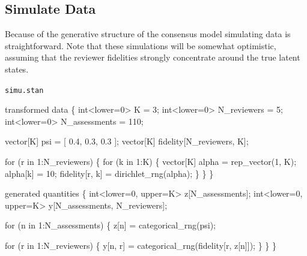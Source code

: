 \documentclass[
  letterpaper,
  DIV=11,
  numbers=noendperiod]{scrartcl}
\newenvironment{Shaded}{\begin{snugshade}}{\end{snugshade}}
\newcommand{\ControlFlowTok}[1]{\textcolor[rgb]{0.00,0.23,0.31}{#1}}
\newcommand{\DataTypeTok}[1]{\textcolor[rgb]{0.68,0.00,0.00}{#1}}
\newcommand{\DecValTok}[1]{\textcolor[rgb]{0.68,0.00,0.00}{#1}}
\newcommand{\FloatTok}[1]{\textcolor[rgb]{0.68,0.00,0.00}{#1}}
\newcommand{\KeywordTok}[1]{\textcolor[rgb]{0.00,0.23,0.31}{#1}}
\newcommand{\NormalTok}[1]{\textcolor[rgb]{0.00,0.23,0.31}{#1}}
\begin{document}
\hypertarget{simulate-data}{%
\subsection{Simulate Data}\label{simulate-data}}

Because of the generative structure of the consensus model simulating
data is straightforward. Note that these simulations will be somewhat
optimistic, assuming that the reviewer fidelities strongly concentrate
around the true latent states.

\begin{codelisting}

\caption{\texttt{simu.stan}}

\begin{Shaded}
\begin{Highlighting}[]
\KeywordTok{transformed data}\NormalTok{ \{}
  \DataTypeTok{int}\NormalTok{\textless{}}\KeywordTok{lower}\NormalTok{=}\DecValTok{0}\NormalTok{\textgreater{} K = }\DecValTok{3}\NormalTok{;}
  \DataTypeTok{int}\NormalTok{\textless{}}\KeywordTok{lower}\NormalTok{=}\DecValTok{0}\NormalTok{\textgreater{} N\_reviewers = }\DecValTok{5}\NormalTok{;}
  \DataTypeTok{int}\NormalTok{\textless{}}\KeywordTok{lower}\NormalTok{=}\DecValTok{0}\NormalTok{\textgreater{} N\_assessments = }\DecValTok{110}\NormalTok{;}
  
  \DataTypeTok{vector}\NormalTok{[K] psi = [ }\FloatTok{0.4}\NormalTok{, }\FloatTok{0.3}\NormalTok{, }\FloatTok{0.3}\NormalTok{ ]\textquotesingle{};}
  \DataTypeTok{vector}\NormalTok{[K] fidelity[N\_reviewers, K];}
  
  \ControlFlowTok{for}\NormalTok{ (r }\ControlFlowTok{in} \DecValTok{1}\NormalTok{:N\_reviewers) \{}
    \ControlFlowTok{for}\NormalTok{ (k }\ControlFlowTok{in} \DecValTok{1}\NormalTok{:K) \{}
      \DataTypeTok{vector}\NormalTok{[K] alpha = rep\_vector(}\DecValTok{1}\NormalTok{, K);}
\NormalTok{      alpha[k] = }\DecValTok{10}\NormalTok{;}
\NormalTok{      fidelity[r, k] = dirichlet\_rng(alpha);}
\NormalTok{    \}}
\NormalTok{  \}}
\NormalTok{\}}

\KeywordTok{generated quantities}\NormalTok{ \{}
  \DataTypeTok{int}\NormalTok{\textless{}}\KeywordTok{lower}\NormalTok{=}\DecValTok{0}\NormalTok{, }\KeywordTok{upper}\NormalTok{=K\textgreater{} z[N\_assessments];}
  \DataTypeTok{int}\NormalTok{\textless{}}\KeywordTok{lower}\NormalTok{=}\DecValTok{0}\NormalTok{, }\KeywordTok{upper}\NormalTok{=K\textgreater{} y[N\_assessments, N\_reviewers];}
  
  \ControlFlowTok{for}\NormalTok{ (n }\ControlFlowTok{in} \DecValTok{1}\NormalTok{:N\_assessments) \{}
\NormalTok{    z[n] = categorical\_rng(psi);}
    
    \ControlFlowTok{for}\NormalTok{ (r }\ControlFlowTok{in} \DecValTok{1}\NormalTok{:N\_reviewers) \{}
\NormalTok{      y[n, r] = categorical\_rng(fidelity[r, z[n]]);}
\NormalTok{    \}}
\NormalTok{  \}}
\NormalTok{\}}
\end{Highlighting}
\end{Shaded}

\end{codelisting}
\end{document}
